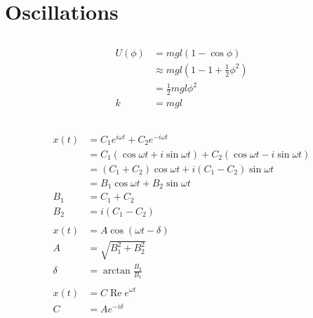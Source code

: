 \documentclass{article}
\renewcommand{\Re}{\operatorname{Re}}
\begin{document}
\section{Oscillations}

\setcounter{subsection}{2}
\subsection{}

\begin{align*}
  U(\phi) & = m g l (1 - \cos \phi)                                 \\
          & \approx m g l \left( 1 - 1 + \frac{1}{2} \phi^2 \right) \\
          & = \frac{1}{2} m g l \phi^2                              \\
  k       & = m g l
\end{align*}

\setcounter{subsection}{4}
\subsection{}

\begin{align*}
  x(t)   & = C_1 e^{i \omega t} + C_2 e^{-i \omega t}                                      \\
         & = C_1 (\cos \omega t + i \sin \omega t) + C_2 (\cos \omega t - i \sin \omega t) \\
         & = (C_1 + C_2) \cos \omega t + i (C_1 - C_2) \sin \omega t                       \\
         & = B_1 \cos \omega t + B_2 \sin \omega t                                         \\
  B_1    & = C_1 + C_2                                                                     \\
  B_2    & = i (C_1 - C_2)                                                                 \\ \\
  x(t)   & = A \cos (\omega t - \delta)                                                    \\
  A      & = \sqrt{B_1^2 + B_2^2}                                                          \\
  \delta & = \arctan \frac{B_2}{B_1}                                                       \\ \\
  x(t)   & = C \Re e^{\omega t}                                                            \\
  C      & = A e^{-i \delta}
\end{align*}
\end{document}
